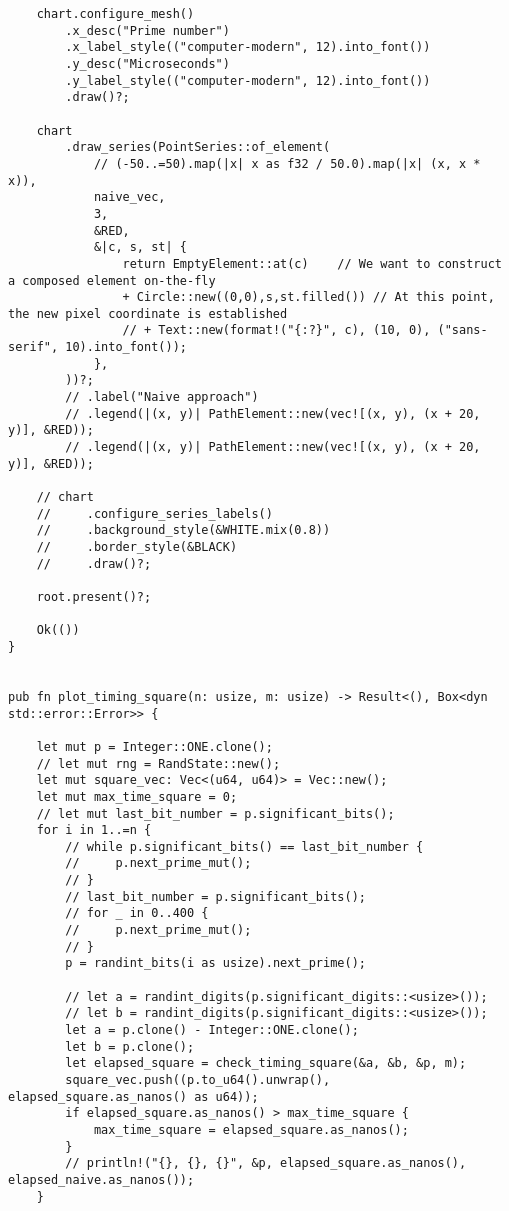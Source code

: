 \begin{verbatim}
    chart.configure_mesh()
        .x_desc("Prime number")
        .x_label_style(("computer-modern", 12).into_font())
        .y_desc("Microseconds")
        .y_label_style(("computer-modern", 12).into_font())
        .draw()?;

    chart
        .draw_series(PointSeries::of_element(
            // (-50..=50).map(|x| x as f32 / 50.0).map(|x| (x, x * x)),
            naive_vec,
            3,
            &RED,
            &|c, s, st| {
                return EmptyElement::at(c)    // We want to construct a composed element on-the-fly
                + Circle::new((0,0),s,st.filled()) // At this point, the new pixel coordinate is established
                // + Text::new(format!("{:?}", c), (10, 0), ("sans-serif", 10).into_font());
            },
        ))?;
        // .label("Naive approach")
        // .legend(|(x, y)| PathElement::new(vec![(x, y), (x + 20, y)], &RED));
        // .legend(|(x, y)| PathElement::new(vec![(x, y), (x + 20, y)], &RED));

    // chart
    //     .configure_series_labels()
    //     .background_style(&WHITE.mix(0.8))
    //     .border_style(&BLACK)
    //     .draw()?;

    root.present()?;
    
    Ok(())
}


pub fn plot_timing_square(n: usize, m: usize) -> Result<(), Box<dyn std::error::Error>> {

    let mut p = Integer::ONE.clone();
    // let mut rng = RandState::new();
    let mut square_vec: Vec<(u64, u64)> = Vec::new();
    let mut max_time_square = 0;
    // let mut last_bit_number = p.significant_bits();
    for i in 1..=n {
        // while p.significant_bits() == last_bit_number {
        //     p.next_prime_mut();
        // }
        // last_bit_number = p.significant_bits();
        // for _ in 0..400 {
        //     p.next_prime_mut();
        // }
        p = randint_bits(i as usize).next_prime();

        // let a = randint_digits(p.significant_digits::<usize>());
        // let b = randint_digits(p.significant_digits::<usize>());
        let a = p.clone() - Integer::ONE.clone();
        let b = p.clone();
        let elapsed_square = check_timing_square(&a, &b, &p, m);
        square_vec.push((p.to_u64().unwrap(), elapsed_square.as_nanos() as u64));
        if elapsed_square.as_nanos() > max_time_square {
            max_time_square = elapsed_square.as_nanos();
        }
        // println!("{}, {}, {}", &p, elapsed_square.as_nanos(), elapsed_naive.as_nanos());
    }



\end{verbatim}
